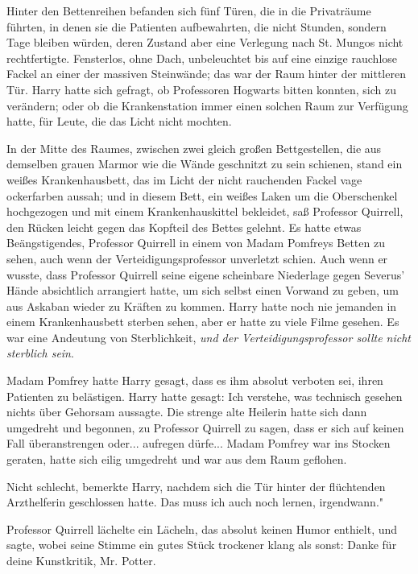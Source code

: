 Hinter den Bettenreihen befanden sich fünf Türen, die in die Privaträume
führten, in denen sie die Patienten aufbewahrten, die nicht Stunden, sondern
Tage bleiben würden, deren Zustand aber eine Verlegung nach St. Mungos nicht
rechtfertigte. Fensterlos, ohne Dach, unbeleuchtet bis auf eine einzige
rauchlose Fackel an einer der massiven Steinwände; das war der Raum hinter der
mittleren Tür. Harry hatte sich gefragt, ob Professoren Hogwarts bitten konnten,
sich zu verändern; oder ob die Krankenstation immer einen solchen Raum zur
Verfügung hatte, für Leute, die das Licht nicht mochten.

In der Mitte des Raumes, zwischen zwei gleich großen Bettgestellen, die aus
demselben grauen Marmor wie die Wände geschnitzt zu sein schienen, stand ein
weißes Krankenhausbett, das im Licht der nicht rauchenden Fackel vage
ockerfarben aussah; und in diesem Bett, ein weißes Laken um die Oberschenkel
hochgezogen und mit einem Krankenhauskittel bekleidet, saß Professor Quirrell,
den Rücken leicht gegen das Kopfteil des Bettes gelehnt. Es hatte etwas
Beängstigendes, Professor Quirrell in einem von Madam Pomfreys Betten zu sehen,
auch wenn der Verteidigungsprofessor unverletzt schien. Auch wenn er wusste,
dass Professor Quirrell seine eigene scheinbare Niederlage gegen Severus' Hände
absichtlich arrangiert hatte, um sich selbst einen Vorwand zu geben, um aus
Askaban wieder zu Kräften zu kommen. Harry hatte noch nie jemanden in einem
Krankenhausbett sterben sehen, aber er hatte zu viele Filme gesehen. Es war eine
Andeutung von Sterblichkeit, \emph{und der Verteidigungsprofessor sollte nicht
sterblich sein}.

Madam Pomfrey hatte Harry gesagt, dass es ihm absolut verboten sei, ihren
Patienten zu belästigen. Harry hatte gesagt: \glqq{}Ich verstehe\grqq{}, was
technisch gesehen nichts über Gehorsam aussagte. Die strenge alte Heilerin hatte
sich dann umgedreht und begonnen, zu Professor Quirrell zu sagen, dass er sich
auf keinen Fall überanstrengen oder... aufregen dürfe... Madam Pomfrey war ins
Stocken geraten, hatte sich eilig umgedreht und war aus dem Raum geflohen.

\glqq{}Nicht schlecht\grqq{}, bemerkte Harry, nachdem sich die Tür hinter der
flüchtenden Arzthelferin geschlossen hatte. \glqq{}Das muss ich auch noch lernen,
irgendwann."

Professor Quirrell lächelte ein Lächeln, das absolut keinen Humor enthielt, und
sagte, wobei seine Stimme ein gutes Stück trockener klang als sonst: \glqq{}Danke
für deine Kunstkritik, Mr. Potter.\grqq{}

